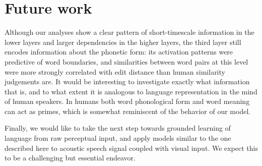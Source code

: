 
\section{Future work}
Although our analyses show a clear pattern of short-timescale
information in the lower layers and larger dependencies in the higher
layers, the third layer still encodes information about the phonetic
form: its activation patterns were predictive of word boundaries, and
similarities between word pairs at this level were more strongly
correlated with edit distance than human similarity judgements are. It
would be interesting to investigate exactly what information that is,
and to what extent it is analogous to language representation in the
mind of human speakers. In humans both word phonological form and word
meaning can act as primes, which is somewhat reminiscent of the
behavior of  our model. 

Finally, we would like to take the next step towards grounded learning of language from raw perceptual input, and apply models similar to the one described here to acoustic speech signal coupled with visual input. We expect this to be a challenging but essential endeavor.

